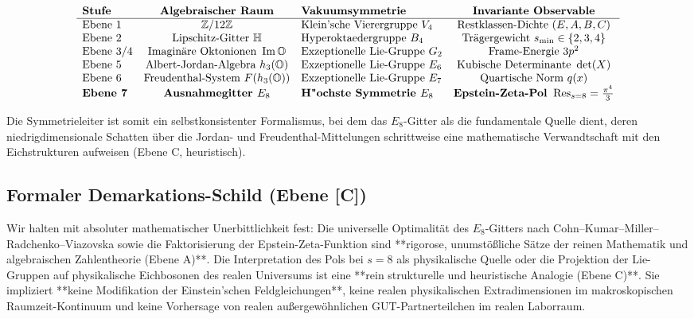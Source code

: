 \documentclass[11pt,a4paper]{article}
\theoremstyle{definition}
\begin{document}
	\begin{equation}
		\begin{array}{lclc}
			\text{\textbf{Stufe}} & \text{\textbf{Algebraischer Raum}} & \text{\textbf{Vakuumsymmetrie}} & \text{\textbf{Invariante Observable}} \\
			\hline
			\text{Ebene 1} & \mathbb{Z}/12\mathbb{Z} & \text{Klein'sche Vierergruppe } V_4 & \text{Restklassen-Dichte } (E,A,B,C) \\
			\text{Ebene 2} & \text{Lipschitz-Gitter } \mathbb{H} & \text{Hyperoktaedergruppe } B_4 & \text{Trägergewicht } s_{\min} \in \{2,3,4\} \\
			\text{Ebene 3/4} & \text{Imaginäre Oktonionen } \operatorname{Im}\mathbb{O} & \text{Exzeptionelle Lie-Gruppe } G_2 & \text{Frame-Energie } 3p^2 \\
			\text{Ebene 5} & \text{Albert-Jordan-Algebra } h_3(\mathbb{O}) & \text{Exzeptionelle Lie-Gruppe } E_6 & \text{Kubische Determinante } \det(X) \\
			\text{Ebene 6} & \text{Freudenthal-System } F(h_3(\mathbb{O})) & \text{Exzeptionelle Lie-Gruppe } E_7 & \text{Quartische Norm } q(x) \\
			\text{\textbf{Ebene 7}} & \text{\textbf{Ausnahmegitter }} E_8 & \text{\textbf{H"{o}chste Symmetrie }} E_8 & \text{\textbf{Epstein-Zeta-Pol }} \operatorname{Res}_{s=8} = \frac{\pi^4}{3} \\
		\end{array}
	\end{equation}
	
	Die Symmetrieleiter ist somit ein selbstkonsistenter Formalismus, bei dem das $E_8$-Gitter als die fundamentale Quelle dient, deren niedrigdimensionale Schatten über die Jordan- und Freudenthal-Mittelungen schrittweise eine mathematische Verwandtschaft mit den Eichstrukturen aufweisen (Ebene C, heuristisch).
	
	\subsection{Formaler Demarkations-Schild (Ebene [C])}
	Wir halten mit absoluter mathematischer Unerbittlichkeit fest:
	Die universelle Optimalität des $E_8$-Gitters nach Cohn--Kumar--Miller--Radchenko--Viazovska sowie die Faktorisierung der Epstein-Zeta-Funktion sind **rigorose, unumstößliche Sätze der reinen Mathematik und algebraischen Zahlentheorie (Ebene A)**. Die Interpretation des Pols bei $s=8$ als physikalische Quelle oder die Projektion der Lie-Gruppen auf physikalische Eichbosonen des realen Universums ist eine **rein strukturelle und heuristische Analogie (Ebene C)**. Sie impliziert **keine Modifikation der Einstein'schen Feldgleichungen**, keine realen physikalischen Extradimensionen im makroskopischen Raumzeit-Kontinuum und keine Vorhersage von realen außergewöhnlichen GUT-Partnerteilchen im realen Laborraum.
	
\end{document}
